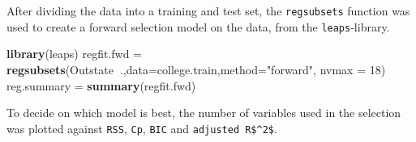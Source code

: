 \documentclass[]{article}
\newenvironment{Shaded}{\begin{snugshade}}{\end{snugshade}}
\newcommand{\DataTypeTok}[1]{\textcolor[rgb]{0.13,0.29,0.53}{#1}}
\newcommand{\DecValTok}[1]{\textcolor[rgb]{0.00,0.00,0.81}{#1}}
\newcommand{\KeywordTok}[1]{\textcolor[rgb]{0.13,0.29,0.53}{\textbf{#1}}}
\newcommand{\NormalTok}[1]{#1}
\newcommand{\OperatorTok}[1]{\textcolor[rgb]{0.81,0.36,0.00}{\textbf{#1}}}
\newcommand{\StringTok}[1]{\textcolor[rgb]{0.31,0.60,0.02}{#1}}
\begin{document}
After dividing the data into a training and test set, the
\texttt{regsubsets} function was used to create a forward selection
model on the data, from the \texttt{leaps}-library.

\begin{Shaded}
\begin{Highlighting}[]
\KeywordTok{library}\NormalTok{(leaps)}
\NormalTok{regfit.fwd =}\StringTok{ }\KeywordTok{regsubsets}\NormalTok{(Outstate}\OperatorTok{~}\NormalTok{.,}\DataTypeTok{data=}\NormalTok{college.train,}\DataTypeTok{method=}\StringTok{"forward"}\NormalTok{, }\DataTypeTok{nvmax =} \DecValTok{18}\NormalTok{)}
\NormalTok{reg.summary =}\StringTok{ }\KeywordTok{summary}\NormalTok{(regfit.fwd)}
\end{Highlighting}
\end{Shaded}

To decide on which model is best, the number of variables used in the
selection was plotted against \texttt{RSS}, \texttt{Cp}, \texttt{BIC}
and \texttt{adjusted\ R\$\^{}2\$}.
\end{document}
